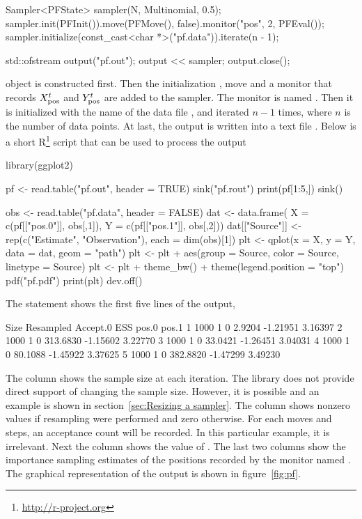 \begin{cppcode}
    Sampler<PFState> sampler(N, Multinomial, 0.5);
    sampler.init(PFInit()).move(PFMove(), false).monitor("pos", 2, PFEval());
    sampler.initialize(const_cast<char *>("pf.data")).iterate(n - 1);

    std::ofstream output("pf.out");
    output << sampler;
    output.close();
\end{cppcode}
 object is constructed first. Then the
initialization , move  and a monitor
 that records $X_{\mathrm{pos}}^t$ and $Y_{\mathrm{pos}}^t$ are added to the
sampler. The monitor is named . Then it is initialized with
the name of the data file , and iterated $n - 1$ times,
where $n$ is the number of data points. At last, the output is written into a
text file . Below is a short
R\footnote{\url{http://r-project.org}} script that can be used to process the
output
\begin{rcode}
  library(ggplot2)

  pf <- read.table("pf.out", header = TRUE)
  sink("pf.rout")
  print(pf[1:5,])
  sink()

  obs <- read.table("pf.data", header = FALSE)
  dat <- data.frame(
  X = c(pf[["pos.0"]], obs[,1]),
  Y = c(pf[["pos.1"]], obs[,2]))
  dat[["Source"]] <- rep(c("Estimate", "Observation"), each = dim(obs)[1])
  plt <- qplot(x = X, y = Y, data = dat, geom = "path")
  plt <- plt + aes(group = Source, color = Source, linetype = Source)
  plt <- plt + theme_bw() + theme(legend.position = "top")
  pdf("pf.pdf")
  print(plt)
  dev.off()
\end{rcode}

The  statement shows the first five lines of the output,
\begin{textcode}
    Size Resampled Accept.0      ESS    pos.0   pos.1
  1 1000         1        0   2.9204 -1.21951 3.16397
  2 1000         1        0 313.6830 -1.15602 3.22770
  3 1000         1        0  33.0421 -1.26451 3.04031
  4 1000         1        0  80.1088 -1.45922 3.37625
  5 1000         1        0 382.8820 -1.47299 3.49230
\end{textcode}
The column  shows the sample size at each iteration. The
library does not provide direct support of changing the sample size. However,
it is possible and an example is shown in section~\ref{sec:Resizing a sampler}.
The column  shows nonzero values if resampling were
performed and zero otherwise. For each moves and \mcmc steps, an acceptance
count will be recorded. In this particular example, it is irrelevant. Next the
column  shows the value of \ess. The last two columns show the
importance sampling estimates of the positions recorded by the monitor named
. The graphical representation of the output is shown in
figure~\ref{fig:pf}.

